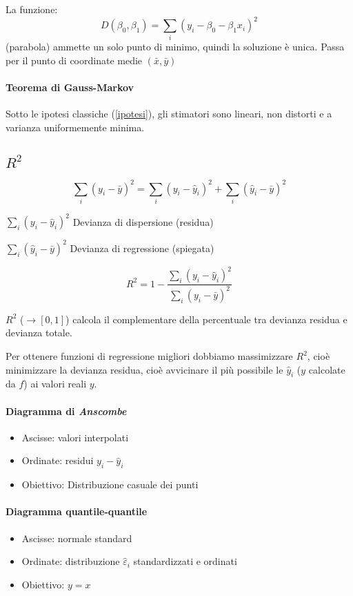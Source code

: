 \documentclass[11pt,onecolumn,a4paper,oneside]{book}
\begin{document}
La funzione:$$D(\beta_0, \beta_1) = \sum_i(y_i - \beta_0 - \beta_1 x_i)^2$$ (parabola) ammette un solo punto di minimo, quindi la soluzione è unica.
Passa per il punto di coordinate medie $(\bar x, \bar y )$

\paragraph{Teorema di Gauss-Markov}
Sotto le ipotesi classiche (\ref{ipotesi}), gli stimatori sono lineari, non distorti e a varianza uniformemente minima.

\subsection{$R^2$}
$$\sum_i (y_i - \bar y)^2 = \sum_i(y_i- \hat y_i) ^2 + \sum_i(\hat y_i- \bar y) ^2$$

$\sum_i(y_i - \hat y_i)^2$ Devianza di dispersione (residua)

$\sum_i(\hat y_i- \bar y) ^2$ Devianza di regressione (spiegata)

$$R^2 = 1- \frac{\sum_i(y_i-\hat y_i)^2}{\sum_i(y_i-\bar y)^2}$$

$R^2$ ($\rightarrow [0,1] $) calcola il complementare della percentuale tra devianza residua e devianza totale.

Per ottenere funzioni di regressione migliori dobbiamo massimizzare $R^2$, cioè minimizzare la devianza residua, cioè avvicinare il più possibile le $\hat y_i$ ($y$ calcolate da $f$) ai valori reali $y$.

\paragraph{Diagramma di \emph{Anscombe}}
\begin{itemize}
\item Ascisse: valori interpolati
\item Ordinate: residui $y_i - \hat y_i$
\item Obiettivo: Distribuzione casuale dei punti
\end{itemize}

\paragraph{Diagramma quantile-quantile}
\begin{itemize}
\item Ascisse: normale standard
\item Ordinate: distribuzione $\hat \varepsilon_i$ standardizzati e ordinati
\item Obiettivo: $y=x$
\end{itemize}
\end{document}
